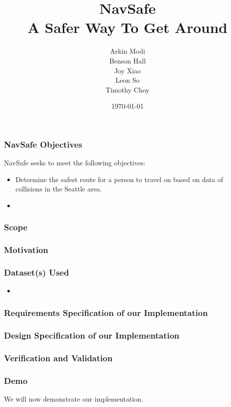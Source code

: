 \documentclass[t,12pt,numbers,fleqn]{beamer}
\title{
    NavSafe\\
    \large A Safer Way To Get Around
}
\author{
    Arkin Modi\\
    Benson Hall\\
    Joy Xiao\\
    Leon So\\
    Timothy Choy
}
\institute{Department of Software and Computing, McMaster University}
\date{\today}
\begin{document}
 
\frame{\titlepage}


\begin{frame}
\frametitle{NavSafe Objectives}
NavSafe seeks to meet the following objectives:
\begin{itemize}
    \item Determine the safest route for a person to travel on based on data of collisions in the Seattle area.
    \item 
\end{itemize}
\end{frame}
 
\begin{frame}
\frametitle{Scope}

\end{frame}
\begin{frame}
\frametitle{Motivation}

\end{frame}
\begin{frame}
\frametitle{Dataset(s) Used}
\begin{itemize}
    \item
\end{itemize}
\end{frame}
\begin{frame}
\frametitle{Requirements Specification of our Implementation}

\end{frame}
\begin{frame}
\frametitle{Design Specification of our Implementation}
    
\end{frame}
\begin{frame}
\frametitle{Verification and Validation}

\end{frame}
\begin{frame}
\frametitle{Demo}
We will now demonstrate our implementation.
\end{frame}
\end{document}
